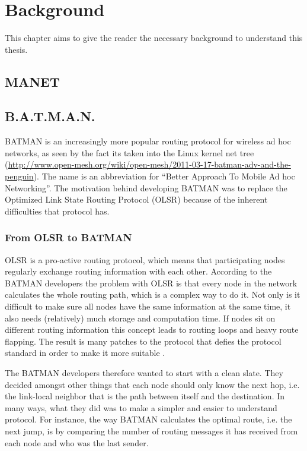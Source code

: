 \chapter{Background}
\label{ch:background}
\acresetall

This chapter aims to give the reader the necessary background to understand this
thesis.

\section{\acf{MANET}}

\section{B.A.T.M.A.N.}
BATMAN \cite{batman_rfc} is an increasingly more popular routing protocol for
wireless ad hoc networks, as seen by the fact its taken into the Linux kernel
net tree
(\url{http://www.open-mesh.org/wiki/open-mesh/2011-03-17-batman-adv-and-the-penguin}).
The name is an abbreviation for ``Better Approach To Mobile Ad hoc Networking''.
The motivation behind developing BATMAN was to replace the Optimized Link State
Routing Protocol (OLSR) \cite{why-starting-batman} because of the inherent
difficulties that protocol has.

\subsection{From OLSR to BATMAN}
OLSR is a pro-active routing protocol, which means that participating nodes
regularly exchange routing information with each other. According to the BATMAN
developers the problem with OLSR is that every node in the network calculates
the whole routing path, which is a complex way to do it. Not only is it
difficult to make sure all nodes have the same information at the same time,
it also needs (relatively) much storage and computation time. If nodes sit on
different routing information this concept leads to routing loops and heavy
route flapping. The result is many patches to the protocol that defies the
protocol standard in order to make it more suitable \cite{why-starting-batman}.

The BATMAN developers therefore wanted to start with a clean slate. They decided
amongst other things that each node should only know the next hop, i.e. the
link-local neighbor that is the path between itself and the destination. In
many ways, what they did was to make a simpler and easier to understand
protocol. For instance, the way BATMAN calculates the optimal route, i.e. the
next jump, is by comparing the number of routing messages it has received from
each node and who was the last sender.

